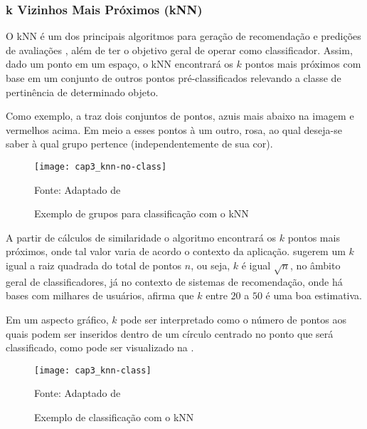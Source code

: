         \subsubsection{k Vizinhos Mais Próximos (kNN)}
            
            O kNN é um dos principais algoritmos para geração de recomendação e predições de avaliações \cite{Bobadilla_2013}, além de ter o objetivo geral de operar como classificador. Assim, dado um ponto em um espaço, o kNN encontrará os $k$ pontos mais próximos com base em um conjunto de outros pontos pré-classificados relevando a classe de pertinência de determinado objeto. 
            
            Como exemplo, a  traz dois conjuntos de pontos, azuis mais abaixo na imagem e vermelhos acima. Em meio a esses pontos à um outro, rosa, ao qual deseja-se saber à qual grupo pertence (independentemente de sua cor).             
            
            \begin{figure}[htb]
                \caption{Exemplo de grupos para classificação com o kNN}
                \texttt{[image: cap3\_knn-no-class]}
                \label{fig:cap3_knn-no-class}
                
                {\footnotesize Fonte: Adaptado de }
            \end{figure}
                        
            A partir de cálculos de similaridade o algoritmo encontrará os $k$ pontos mais próximos, onde tal valor varia de acordo o contexto da aplicação.  sugerem um $k$  igual a raiz quadrada do total de pontos $n$, ou seja, $k$ é igual $\sqrt{n}$, no âmbito geral de classificadores, já no contexto de sistemas de recomendação, onde há bases com milhares de usuários,  afirma que $k$ entre $20$ a $50$ é uma boa estimativa. 
            
            Em um aspecto gráfico, $k$ pode ser interpretado como o número de pontos aos quais podem ser inseridos dentro de um círculo centrado no ponto que será classificado, como pode ser visualizado na . 
            
            \begin{figure}[htb]
                \caption{Exemplo de classificação com o kNN}
                \texttt{[image: cap3\_knn-class]}
                \label{fig:cap3_knn-class}
                
                {\footnotesize Fonte: Adaptado de }
            \end{figure}            
            
